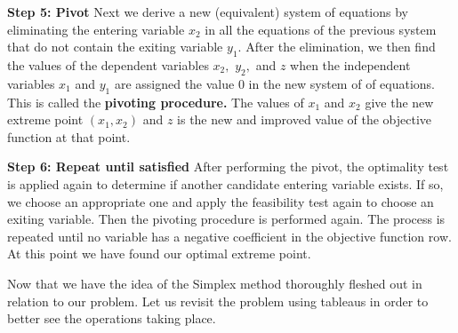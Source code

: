 \begin{example}
\textbf{Step 5: Pivot}\newline
Next we derive a new (equivalent) system of equations by eliminating the entering variable $x_2$ in all the equations of the previous system that do not contain the exiting variable $y_1.$ After the elimination, we then find the values of the dependent variables $x_2,$ $y_2,$ and $z$ when the independent variables $x_1$ and $y_1$ are assigned the value 0 in the new system of of equations. This is called the \textbf{pivoting procedure.} The values of $x_1$ and $x_2$ give the new extreme point $(x_1,x_2)$ and $z$ is the new and improved value of the objective function at that point. \newline

\textbf{Step 6: Repeat until satisfied}\newline
After performing the pivot, the optimality test is applied again to determine if another candidate entering variable exists. If so, we choose an appropriate one and apply the feasibility test again to choose an exiting variable. Then the pivoting procedure is performed again. The process is repeated until no variable has a negative coefficient in the objective function row. At this point we have found our optimal extreme point.

\end{example}

Now that we have the idea of the Simplex method thoroughly fleshed out in relation to our problem. Let us revisit the problem using tableaus in order to better see the operations taking place.

